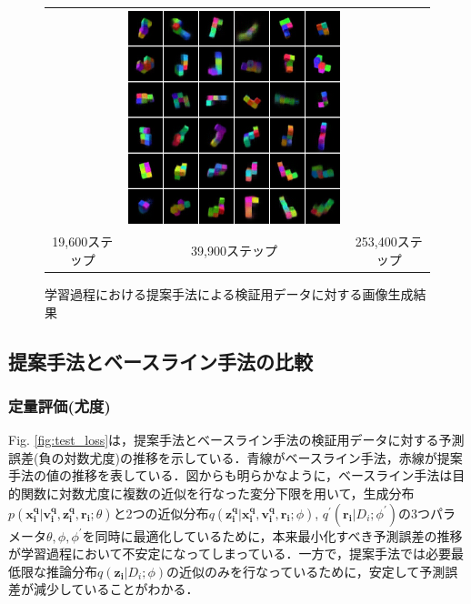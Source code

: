 \begin{figure}[tbp]
\begin{center}
\begin{tabular}{ccc}
\begin{minipage}{0.33\linewidth}
\begin{center}
        \end{center}
      \end{minipage}&
      \begin{minipage}{0.33\linewidth}
        \begin{center}
          \includegraphics[width=\linewidth]{./figures/proposal253400.png}
        \end{center}
      \end{minipage}\\
      19,600ステップ&39,900ステップ&253,400ステップ
      \end{tabular}
    \caption{学習過程における提案手法による検証用データに対する画像生成結果}
    \label{fig:generation}
  \end{center}
\end{figure}

\subsection{提案手法とベースライン手法の比較}
\subsubsection{定量評価(尤度)}
Fig. \ref{fig:test_loss}は，提案手法とベースライン手法の検証用データに対する予測誤差(負の対数尤度)の推移を示している．青線がベースライン手法，赤線が提案手法の値の推移を表している．図からも明らかなように，ベースライン手法は目的関数に対数尤度に複数の近似を行なった変分下限を用いて，生成分布$p ( \bm{x_i ^ q} | \bm{v_i ^ q} , \bm{z _i^ q} , \bm{r_i} ; \theta )$と2つの近似分布$q(\bm{z_i^q}|\bm{x_i^q}, \bm{v_i^q}, \bm{r_i}; \phi)$, $q^\prime ( \bm{r_i} | D_i ; {\phi}^\prime )$の3つパラメータ$\theta, \phi, \phi^\prime$を同時に最適化しているために，本来最小化すべき予測誤差の推移が学習過程において不安定になってしまっている．一方で，提案手法では必要最低限な推論分布$q ( \bm{z_i} | D_i ; \phi )$の近似のみを行なっているために，安定して予測誤差が減少していることがわかる．


